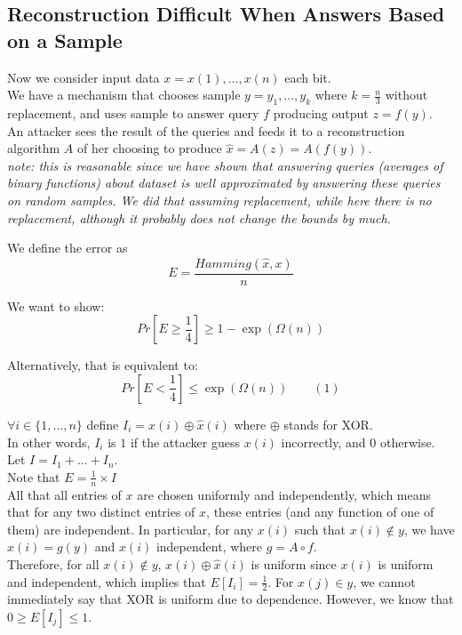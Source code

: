 \subsection{Reconstruction Difficult When Answers Based on a Sample}
Now we consider input data $x = x(1), ..., x(n)$ each bit. \\

\noindent We have a mechanism that chooses sample $y = y_1, ..., y_k$ where $k = \frac{n}{3}$ without replacement, and uses sample to answer query $f$ producing output $z = f(y)$. \\

\noindent An attacker sees the result of the queries and feeds it to a reconstruction algorithm $A$ of her choosing to produce $\hat{x} = A(z) = A(f(y))$. \\

\noindent \textit{note: this is reasonable since we have shown that answering queries (averages of binary functions) about dataset is well approximated by answering these queries on random samples. We did that assuming replacement, while here there is no replacement, although it probably does not change the bounds by much.\\}

\noindent We define the error as 
$$E = \frac{\textit{Hamming}(\hat{x}, x)}{n}$$

\noindent We want to show:
$$ Pr[ E \geq \frac{1}{4} ] \geq 1 - \exp(\Omega(n)) $$

\noindent Alternatively, that is equivalent to:
$$ Pr[ E < \frac{1}{4} ] \leq \exp(\Omega(n)) \quad \quad(1) $$

\noindent $\forall i \in \{1, ..., n \}$ define $I_i = x(i) \oplus \hat{x}(i)$  where $\oplus$ stands for XOR. \\
In other words, $I_i$ is $1$ if the attacker guess $x(i)$ incorrectly, and $0$ otherwise. \\
Let $I = I_1 + ... + I_n$. \\
Note that $E = \frac{1}{n} \times I$ \\

\noindent All that all entries of $x$ are chosen uniformly and independently, which means that for any two distinct entries of $x$, these entries (and any function of one of them) are independent. In particular, for any $x(i)$ such that $x(i) \not\in y$, we have $\hat{x}(i) = g(y)$ and $x(i)$ independent, where $g = A \circ f$. \\

\noindent Therefore, for all $x(i) \not\in y$, $x(i) \oplus \hat{x}(i)$ is uniform since $x(i)$ is uniform and independent, which implies that $E[I_i] = \frac{1}{2}$. For $x(j) \in y$, we cannot immediately say that XOR is uniform due to dependence. However, we know that $0 \geq E[I_j] \leq 1$. \\

